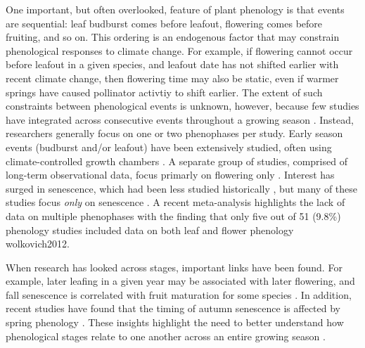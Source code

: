\documentclass{article}
\begin{document}
\par One important, but often overlooked, feature of plant phenology is that events are sequential: leaf budburst comes before leafout, flowering comes before fruiting, and so on. This ordering is an endogenous factor that may constrain phenological responses to climate change. For example, if flowering cannot occur before leafout in a given species, and leafout date has not shifted earlier with recent climate change, then flowering time may also be static, even if warmer springs have caused pollinator activtiy to shift earlier. The extent of such constraints between phenological events is unknown, however, because few studies have integrated across consecutive events throughout a growing season \citep{wolkovich2014}. Instead, researchers generally focus on one or two phenophases per study. Early season events (budburst and/or leafout) have been extensively studied, often using climate-controlled growth chambers \citep[e.g.,][]{basler2012,laube2014}. A separate group of studies, comprised of long-term observational data, focus primarly on flowering only  \citep[e.g.,] []{fitter2002,millerrushing2008}. Interest has surged in senescence, which had been less studied historically \citep {parmesan2006}, but many of these studies focus \textit{only} on senescence \citep[e.g.][]{taylor2008,archetti2013,jeong2014}. A recent meta-analysis highlights the lack of data on multiple phenophases with the finding that only five out of 51 (9.8\%) phenology studies included data on both leaf and flower phenology {wolkovich2012}. 

\par When research has looked across stages, important links have been found. For example, later  leafing in a given year may be associated with later flowering, and fall senescence is correlated with fruit maturation for some species \citep{lechowicz1995}. In addition, recent studies have found that the timing of autumn senescence is affected by spring phenology \citep {keenan2015,liu2016}. These insights highlight the need to better understand how phenological stages relate to one another across an entire growing season \citep{wolkovich2014}.
\end{document}
